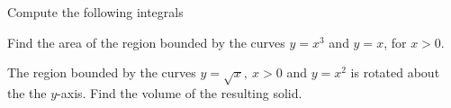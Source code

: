 \documentclass[11pt]{exam}
\begin{document}
%
%
%

\begin{questions}



\addpoints
\question Compute the following integrals

\newpage
\addpoints
\question[1] Find the area of the region bounded by the curves $y=x^3$ and $y=x$, for $x>0$. 

\newpage
\addpoints
\question[2] The region bounded by the curves $y=\sqrt{x}, \ x>0$ and $y=x^2$ is rotated about the the $y$-axis. Find the volume of the resulting solid. 



\end{questions}
\end{document}
